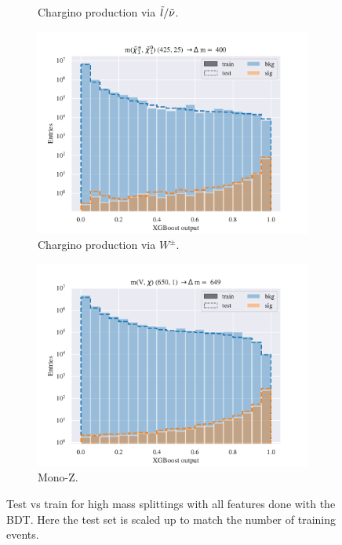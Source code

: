 \begin{figure}[H]
\begin{subfigure}[t!]{0.49\textwidth}
        \caption{Chargino production via $\Tilde{l}/\Tilde{\nu}$.}
        \label{fig:SlepsnuHigh}
    \end{subfigure}
    \begin{subfigure}[t!]{0.49\textwidth}
        \includegraphics[width = \textwidth]{Figures/WW/BDT/All_level/High/scaled_train_test_395330.pdf}
        \caption{Chargino production via $W^\pm$.}
        \label{fig:WWHigh}
    \end{subfigure}
    \begin{subfigure}[t!]{0.49\textwidth}
        \includegraphics[width = \textwidth]{Figures/Mono_Z/ML/BDT/All_level/High/scaled_train_test_310617.pdf}
        \caption{Mono-Z.}
        \label{fig:MonoZHigh}
    \end{subfigure}
    \caption{Test vs train for high mass splittings with all features done with the BDT. Here the test set is scaled up to match the number of training events.}
    \label{fig:AllHighBDT}
\end{figure}

